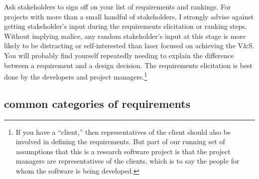 \documentclass[12pt,oneside]{book}
\begin{document}
Ask stakeholders to sign off on your list of requirements and rankings. For projects with more than a small handful of stakeholders, I strongly advise against getting stakeholder's input during the requirements elicitation or ranking steps. Without implying malice, any random stakeholder's input at this stage is more likely to be distracting or self-interested than laser focused on achieving the V\&S. You will probably find yourself repeatedly needing to explain the difference between a requirement and a design decision. The requirements elicitation is best done by the developers and project managers.\footnote{If you have a ``client,'' then representatives of the client should also be involved in defining the requirements. But part of our running set of assumptions that this is a research software project is that the project managers are representatives of the clients, which is to say the people for whom the software is being developed.}

\subsection*{common categories of requirements}
\end{document}
